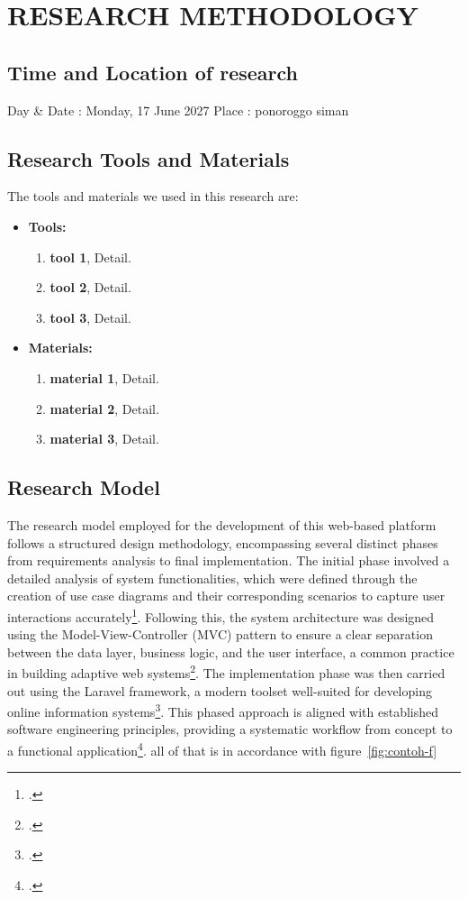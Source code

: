 \chapter{RESEARCH METHODOLOGY}	
	\section{Time and Location of research}
	\setlength{\leftskip}{0.7cm}
	Day \& Date : Monday, 17 June 2027
	Place		: ponoroggo siman
		
		
	\section{Research Tools and Materials}
	
	The tools and materials we used in this research are:
	\begin{itemize}
	\item \textbf{Tools:}
		\begin{enumerate}
		\item \textbf{tool 1}, Detail.
		\item \textbf{tool 2}, Detail.
		\item \textbf{tool 3}, Detail.
		\end{enumerate}
	\item \textbf{Materials:}
		\begin{enumerate}
		\item \textbf{material 1}, Detail.
		\item \textbf{material 2}, Detail.
		\item \textbf{material 3}, Detail.
	\end{enumerate}
	\end{itemize}
	
	\section{Research Model}
	The research model employed for the development of this web-based platform follows a structured design methodology, encompassing several distinct phases from requirements analysis to final implementation. The initial phase involved a detailed analysis of system functionalities, which were defined through the creation of use case diagrams and their corresponding scenarios to capture user interactions accurately\footcite{taufan2022}. Following this, the system architecture was designed using the Model-View-Controller (MVC) pattern to ensure a clear separation between the data layer, business logic, and the user interface, a common practice in building adaptive web systems\footcite{hidayat2012}. The implementation phase was then carried out using the Laravel framework, a modern toolset well-suited for developing online information systems\footcite{prawito2020}. This phased approach is aligned with established software engineering principles, providing a systematic workflow from concept to a functional application\footcite{sommerville2016}.
	all of that is in accordance with figure~\ref{fig:contoh-f}
	
